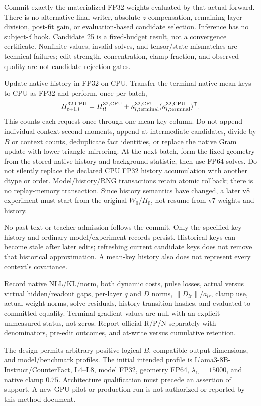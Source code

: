 \documentclass[10pt]{article}
\newcommand{\norm}[1]{\left\lVert#1\right\rVert}
\begin{document}
Commit exactly the materialized FP32 weights evaluated by that actual
forward. There is no alternative final writer, absolute-$z$ compensation,
remaining-layer division, post-fit gain, or evaluation-based candidate
selection. Inference has no subject-$\delta$ hook. Candidate 25 is a
fixed-budget result, not a convergence certificate. Nonfinite values,
invalid solves, and tensor/state mismatches are technical failures;
edit strength, concentration, clamp fraction, and observed quality are
not candidate-rejection gates.

Update native history in FP32 on CPU. Transfer the terminal native mean
keys to CPU as FP32 and perform, once per batch,
\[
 H_{t+1,l}^{32,\rm CPU}=H_{tl}^{32,\rm CPU}
       +\kappa_{l,\rm terminal}^{32,\rm CPU}
        (\kappa_{l,\rm terminal}^{32,\rm CPU})^\top.
\]
This counts each request once through one mean-key column. Do not append
individual-context second moments, append at intermediate candidates,
divide by $B$ or context counts, deduplicate fact identities, or replace
the native Gram update with lower-triangle mirroring. At the next batch, form the fixed
geometry from the stored native history and background statistic, then
use FP64 solves. Do not silently replace the declared CPU FP32 history
accumulation with another dtype or order.
Model/history/RNG transactions retain atomic rollback; there is no
replay-memory transaction. Since history semantics have changed, a later
v8 experiment must start from the original $W_0/H_0$, not resume from
v7 weights and history.

No past text or teacher admission follows the commit. Only the specified
key history and ordinary model/experiment records persist. Historical
keys can become stale after later edits; refreshing current candidate
keys does not remove that historical approximation. A mean-key history
also does not represent every context's covariance.

Record native NLL/KL/norm, both dynamic costs, pulse losses, actual
versus virtual hidden/readout gaps, per-layer $q$ and $D$ norms,
$\norm{D_{lr}}/a_{lr}$, clamp use, actual weight norms, solve residuals,
history transition hashes, and evaluated-to-committed equality. Terminal
gradient values are null with an explicit unmeasured status, not zeros.
Report official R/P/N separately with denominators, pre-edit outcomes,
and at-write versus cumulative retention.

The design permits arbitrary positive logical $B$, compatible output
dimensions, and model/benchmark profiles. The initial intended profile
is Llama3-8B-Instruct/CounterFact, L4--L8, model FP32, geometry FP64,
$\lambda_C=15000$, and native clamp $0.75$. Architecture qualification
must precede an assertion of support. A new GPU pilot or production run
is not authorized or reported by this method document.
\end{document}

